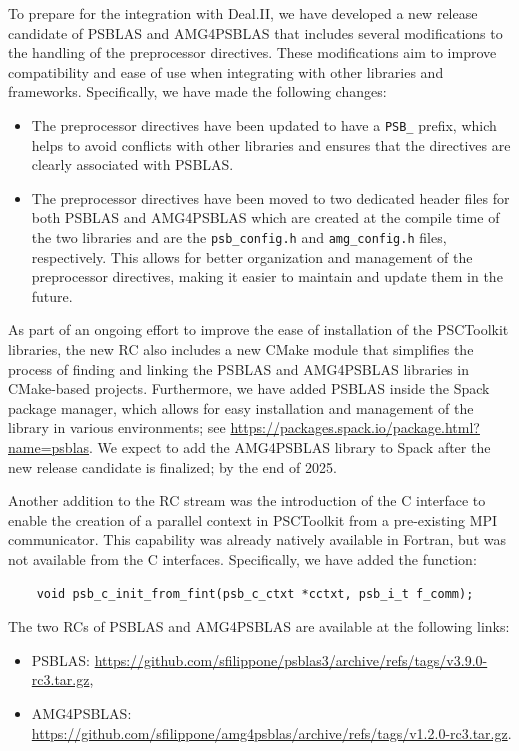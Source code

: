 \documentclass[a4paper,12pt]{article}
\begin{document}
To prepare for the integration with Deal.II, we have developed a new release candidate of PSBLAS and AMG4PSBLAS
that includes several modifications to the handling of the preprocessor directives. These modifications aim
to improve compatibility and ease of use when integrating with other libraries and frameworks.
Specifically, we have made the following changes:
\begin{itemize}
    \item The preprocessor directives have been updated to have a \verb|PSB_| prefix, which helps to
          avoid conflicts with other libraries and ensures that the directives are clearly associated with PSBLAS.
    \item The preprocessor directives have been moved to two dedicated header files for both PSBLAS and AMG4PSBLAS
          which are created at the compile time of the two libraries and are the \verb|psb_config.h| and
          \verb|amg_config.h| files, respectively. This allows for better organization and management of the
          preprocessor directives, making it easier to maintain and update them in the future.
\end{itemize}

As part of an ongoing effort to improve the ease of installation of the PSCToolkit libraries, the new RC also
includes a new CMake module that simplifies the process of finding and linking the PSBLAS and AMG4PSBLAS libraries
in CMake-based projects. Furthermore, we have added PSBLAS inside the Spack package manager, which allows for
easy installation and management of the library in various environments; see \url{https://packages.spack.io/package.html?name=psblas}.
We expect to add the AMG4PSBLAS library to Spack after the new release candidate is finalized; by the end of 2025.

Another addition to the RC stream was the introduction of the C interface to enable the creation of a parallel context
in PSCToolkit from a pre-existing MPI communicator. This capability was already natively available in Fortran,
but was not available from the C interfaces. Specifically, we have added the function:
\begin{verbatim}
    void psb_c_init_from_fint(psb_c_ctxt *cctxt, psb_i_t f_comm);
\end{verbatim}

The two RCs of PSBLAS and AMG4PSBLAS are available at the following links:
\begin{itemize}
    \item PSBLAS: \url{https://github.com/sfilippone/psblas3/archive/refs/tags/v3.9.0-rc3.tar.gz},
    \item AMG4PSBLAS: \url{https://github.com/sfilippone/amg4psblas/archive/refs/tags/v1.2.0-rc3.tar.gz}.
\end{itemize}
\end{document}

